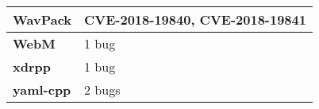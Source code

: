 \begin{longtable}{| p{} | p{} |}
\textbf{WavPack}        & CVE-2018-19840, CVE-2018-19841                                                                                                                                                                     \\ \hline
\textbf{WebM}           & 1 bug                                                                                                                                                                                              \\ \hline
\textbf{xdrpp}          & 1 bug                                                                                                                                                                                              \\ \hline
\textbf{yaml-cpp}       & 2 bugs                                                                                                                                                                                             \\ \hline
\end{longtable}